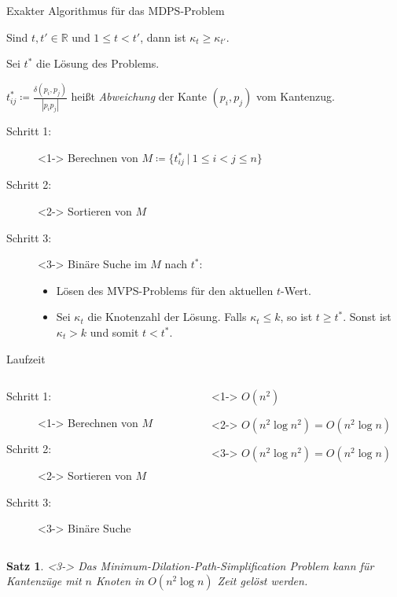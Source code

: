 \documentclass{beamer}
\newtheorem{thm}{Satz}
\begin{document}
	\begin{frame}[t]{Exakter Algorithmus für das MDPS-Problem}
			\begin{lemma}
				Sind $t, t' \in \mathbb{R}$ und $1 \leq t < t'$, dann ist $\kappa_t \geq \kappa_{t'}$.
			\end{lemma}
			Sei $t^*$ die Lösung des Problems.
			
			$t^*_{ij} \coloneqq \frac{\delta(p_i, p_j)}{|p_ip_j|}$ heißt \emph{Abweichung} der Kante $(p_i, p_j)$ vom Kantenzug.
			\vspace{10px}
		\begin{description}
			\item[Schritt 1:]<1-> Berechnen von $M \coloneqq \{t^*_{ij}\ |\ 1\leq i < j \leq n\}$
			\item[Schritt 2:]<2-> Sortieren von $M$
			\item[Schritt 3:]<3-> Binäre Suche im $M$ nach $t^*$:
			\begin{itemize}
				\setlength{\itemindent}{-1.3cm}
				\item Lösen des MVPS-Problems für den aktuellen $t$-Wert.
				\item Sei $\kappa_t$ die Knotenzahl der Lösung. 
				Falls $\kappa_t \leq k$, so ist $t \geq t^*$.
				Sonst ist $\kappa_t > k$ und somit $t < t^*$.
			\end{itemize}
		\end{description}
	\end{frame}
	
	\begin{frame}{Laufzeit}
		\begin{columns}
			\begin{column}{0.5\textwidth}
				\begin{description}
					\item[Schritt 1:]<1-> Berechnen von $M$
					\item[Schritt 2:]<2-> Sortieren von $M$
					\item[Schritt 3:]<3-> Binäre Suche
				\end{description}
			\end{column}
			\begin{column}{0.6\textwidth}
				\begin{description}
					\item[]<1-> $O(n^2)$
					\item[]<2-> $O(n^2 \log n^2) = O(n^2 \log n)$
					\item[]<3-> $O(n^2 \log n^2) = O(n^2 \log n)$
				\end{description}
			\end{column}
		\end{columns}
		\begin{thm}<3->
			Das Minimum-Dilation-Path-Simplification Problem kann für Kantenzüge mit $n$ Knoten in $O(n^2 \log n)$ Zeit gelöst werden.
		\end{thm}
	\end{frame}
	
\end{document}
